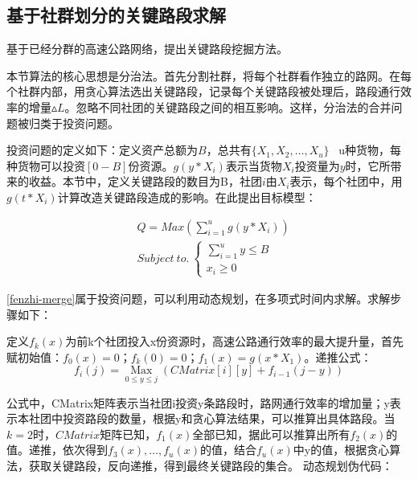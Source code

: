 		\subsection{基于社群划分的关键路段求解}
				基于已经分群的高速公路网络，提出关键路段挖掘方法。

				本节算法的核心思想是分治法。首先分割社群，将每个社群看作独立的路网。在每个社群内部，用贪心算法选出关键路段，记录每个关键路段被处理后，路段通行效率的增量$\vartriangle L$。忽略不同社团的关键路段之间的相互影响。这样，分治法的合并问题被归类于投资问题。

				投资问题的定义如下：定义资产总额为$B$，总共有$\{X_1,X_2,\dots,X_u\}$ \ u种货物，每种货物可以投资$[0-B]$份资源。$g(y*X_{i})$表示当货物$X_i$投资量为$y$时，它所带来的收益。本节中，定义关键路段的数目为B，社团$i$由$X_i$表示，每个社团中，用$g(t*X_{i})$计算改造关键路段造成的影响。在此提出目标模型：

				\begin{align}
				 &Q=Max(\sum\limits_{i = 1}^u {g({y}*{X_i})})   \label{fenzhi-merge} \\
				 &Subject \  to. \  \left\{ {\begin{array}{*{20}{c}}
					  {\sum\limits_{i = 1}^u {{y}}  \leqslant B} \\ 
					  {{x_i} \geqslant 0} 
				\end{array}} \right.
				\end{align}

				\ref{fenzhi-merge}属于投资问题，可以利用动态规划，在多项式时间内求解。求解步骤如下：

				定义$f_k (x)$为前k个社团投入x份资源时，高速公路通行效率的最大提升量，首先赋初始值：$f_0(x)=0$；$f_k(0)=0$；$f_1(x)=g(x*X_{1})$。递推公式：
					$$f_i (j)=\mathop {{\text{Max}}}\limits_{0 \leqslant y \leqslant j} (CMatrix[i][y]+f_{i-1} (j-y))$$

				公式中，CMatrix矩阵表示当社团i投资y条路段时，路网通行效率的增加量；y表示本社团中投资路段的数量，根据y和贪心算法结果，可以推算出具体路段。当$k=2$时，$CMatrix$矩阵已知，$f_1(x)$全部已知，据此可以推算出所有$f_2(x)$的值。递推，依次得到$f_3(x),\dots,f_u(x)$的值，结合$f_u(x)$中y的值，根据贪心算法，获取关键路段，反向递推，得到最终关键路段的集合。
				动态规划伪代码：

